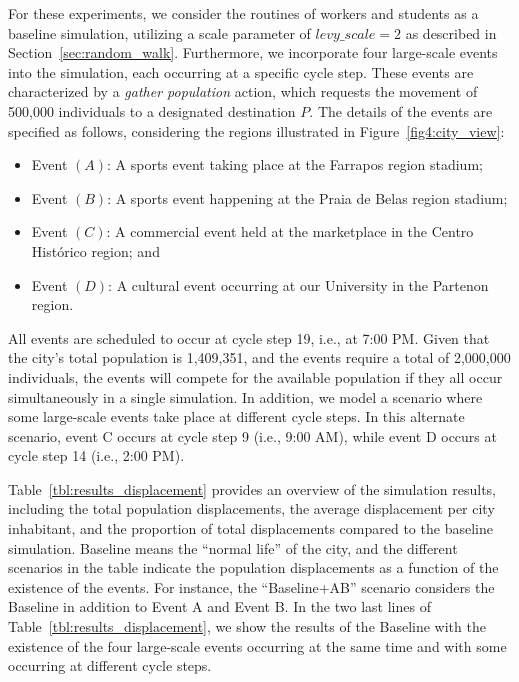 \documentclass[pdflatex,sn-mathphys-num]{sn-jnl}%
\theoremstyle{thmstyleone}%
\theoremstyle{thmstyletwo}%
\theoremstyle{thmstylethree}%
\begin{document}
For these experiments, we consider the routines of workers and students as a baseline simulation, utilizing a scale parameter of $levy\_scale = 2$ as described in Section~\ref{sec:random_walk}.
Furthermore, we incorporate four large-scale events into the simulation, each occurring at a specific cycle step. These events are characterized by a \textit{gather population} action, which requests the movement of 500,000 individuals to a designated destination $P$. The details of the events are specified as follows, considering the regions illustrated in Figure~\ref{fig4:city_view}: 

\begin{itemize}
    \item Event $(A)$: A sports event taking place at the Farrapos region stadium;
    \item Event $(B)$: A sports event happening at the Praia de Belas region stadium;
    \item Event $(C)$: A commercial event held at the marketplace in the Centro Histórico region; and
    \item Event $(D)$: A cultural event occurring at our University in the Partenon region.
\end{itemize}

All events are scheduled to occur at cycle step 19, i.e., at 7:00 PM. Given that the city's total population is 1,409,351, and the events require a total of 2,000,000 individuals, the events will compete for the available population if they all occur simultaneously in a single simulation.
In addition, we model a scenario where some large-scale events take place at different cycle steps. In this alternate scenario, event C occurs at cycle step 9 (i.e., 9:00 AM), while event D occurs at cycle step 14 (i.e., 2:00 PM).

Table~\ref{tbl:results_displacement} provides an overview of the simulation results, including the total population displacements, the average displacement per city inhabitant, and the proportion of total displacements compared to the baseline simulation. Baseline means the ``normal life'' of the city, and the different scenarios in the table indicate the population displacements as a function of the existence of the events. For instance, the ``Baseline+AB'' scenario considers the Baseline in addition to Event A and Event B. In the two last lines of Table~\ref{tbl:results_displacement}, we show the results of the Baseline with the existence of the four large-scale events occurring at the same time and with some occurring at different cycle steps.
\end{document}
